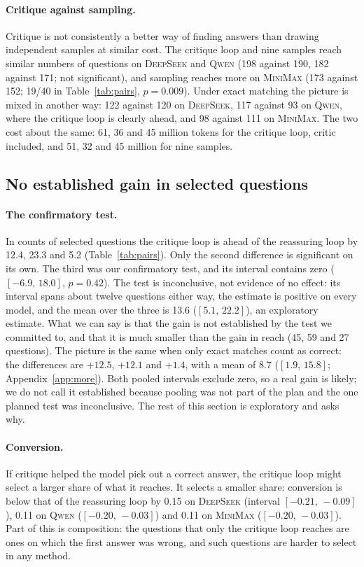 \documentclass[11pt]{article}
\newcommand{\ds}{\textsc{DeepSeek}}
\newcommand{\qw}{\textsc{Qwen}}
\newcommand{\mm}{\textsc{MiniMax}}
\newcommand{\ci}[2]{$[#1,\,#2]$}
\begin{document}
\paragraph{Critique against sampling.}
Critique is not consistently a better way of finding answers than drawing independent samples at similar cost.
The critique loop and nine samples reach similar numbers of questions on \ds{} and \qw{} (198 against 190, 182 against 171; not significant), and sampling reaches more on \mm{} (173 against 152; 19/40 in Table~\ref{tab:pairs}, $p=0.009$).
Under exact matching the picture is mixed in another way: 122 against 120 on \ds, 117 against 93 on \qw, where the critique loop is clearly ahead, and 98 against 111 on \mm.
The two cost about the same: 61, 36 and 45 million tokens for the critique loop, critic included, and 51, 32 and 45 million for nine samples.


\subsection{No established gain in selected questions}
\label{sec:select}

\paragraph{The confirmatory test.}
In counts of selected questions the critique loop is ahead of the reassuring loop by 12.4, 23.3 and 5.2 (Table~\ref{tab:pairs}).
Only the second difference is significant on its own.
The third was our confirmatory test, and its interval contains zero (\ci{-6.9}{18.0}, $p=0.42$).
The test is inconclusive, not evidence of no effect: its interval spans about twelve questions either way, the estimate is positive on every model, and the mean over the three is 13.6 (\ci{5.1}{22.2}), an exploratory estimate.
What we can say is that the gain is not established by the test we committed to, and that it is much smaller than the gain in reach (45, 59 and 27 questions).
The picture is the same when only exact matches count as correct: the differences are $+12.5$, $+12.1$ and $+1.4$, with a mean of 8.7 (\ci{1.9}{15.8}; Appendix~\ref{app:more}).
Both pooled intervals exclude zero, so a real gain is likely; we do not call it established because pooling was not part of the plan and the one planned test was inconclusive.
The rest of this section is exploratory and asks why.

\paragraph{Conversion.}
If critique helped the model pick out a correct answer, the critique loop might select a larger share of what it reaches.
It selects a smaller share: conversion is below that of the reassuring loop by 0.15 on \ds{} (interval \ci{-0.21}{-0.09}), 0.11 on \qw{} (\ci{-0.20}{-0.03}) and 0.11 on \mm{} (\ci{-0.20}{-0.03}).
Part of this is composition: the questions that only the critique loop reaches are ones on which the first answer was wrong, and such questions are harder to select in any method.
\end{document}
